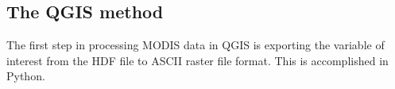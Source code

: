 \subsection{The QGIS method}
\label{app:modqgis}
The first step in processing MODIS data in QGIS is exporting the variable of interest from the HDF file to ASCII raster file format. 
This is accomplished in Python.

